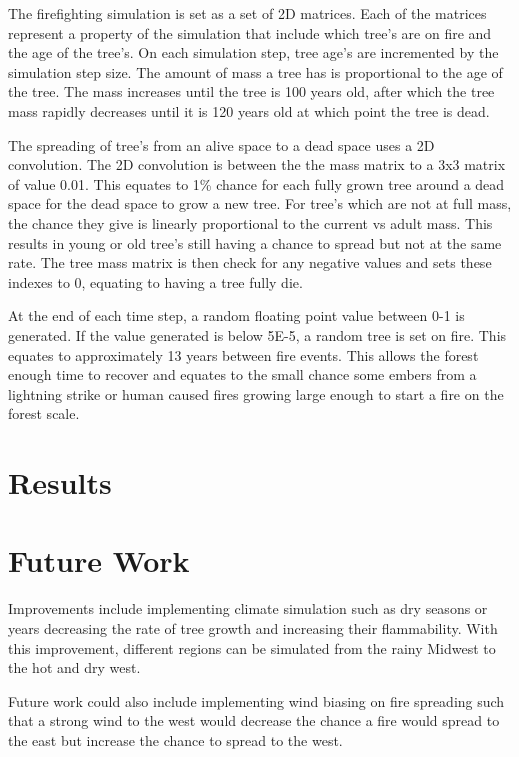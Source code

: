 \documentclass[ aps, pra, reprint, notitlepage ]{revtex4-1}
\begin{document}
The firefighting simulation is set as a set of 2D matrices. Each of the matrices represent a property of the simulation that include which tree's are on fire and the age of the tree's. On each simulation step, tree age's are incremented by the simulation step size. The amount of mass a tree has is proportional to the age of the tree. The mass increases until the tree is 100 years old, after which the tree mass rapidly decreases until it is 120 years old at which point the tree is dead.

The spreading of tree's from an alive space to a dead space uses a 2D convolution. The 2D convolution is between the the mass matrix to a 3x3 matrix of value 0.01. This equates to 1\% chance for each fully grown tree around a dead space for the dead space to grow a new tree. For tree's which are not at full mass, the chance they give is linearly proportional to the current vs adult mass. This results in young or old tree's still having a chance to spread but not at the same rate. The tree mass matrix is then check for any negative values and sets these indexes to 0, equating to having a tree fully die.

At the end of each time step, a random floating point value between 0-1 is generated. If the value generated is below 5E-5, a random tree is set on fire. This equates to approximately 13 years between fire events. This allows the forest enough time to recover and equates to the small chance some embers from a lightning strike or human caused fires growing large enough to start a fire on the forest scale.

\section{\label{Results}Results}




\section{\label{FutureWork}Future Work}

Improvements include implementing climate simulation such as dry seasons or years decreasing the rate of tree growth and increasing their flammability. With this improvement, different regions can be simulated from the rainy Midwest to the hot and dry west.

Future work could also include implementing wind biasing on fire spreading such that a strong wind to the west would decrease the chance a fire would spread to the east but increase the chance to spread to the west.
\end{document}
